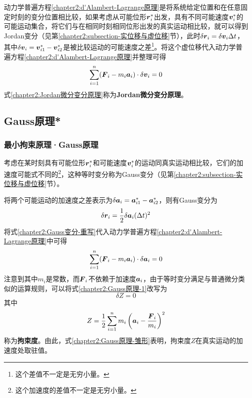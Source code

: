 动力学普遍方程\eqref{chapter2:d'Alambert-Lagrange原理}是将系统给定位置和在任意固定时刻的变分位置相比较，如果考虑从可能位形$\boldsymbol{r}_i^*$出发，具有不同可能速度$\boldsymbol{v}_i^*$的可能运动集合，将它们与在相同时刻相同位形出发的真实运动相比较，就可以得到Jordan变分（见第\ref{chapter2:subsection-实位移与虚位移}节），此时$\delta\boldsymbol{r}_i=\delta \boldsymbol{v}_i\Delta t$，其中$\delta\boldsymbol{v}_i=\boldsymbol{v}_{i1}^*-\boldsymbol{v}_{i2}^*$是被比较运动的可能速度之差\footnote{这个差值不一定是无穷小量。}。将这个虚位移代入动力学普遍方程\eqref{chapter2:d'Alambert-Lagrange原理}并整理可得
\begin{equation}
	\sum_{i=1}^n (\boldsymbol{F}_i-m_i\boldsymbol{a}_i)\cdot \delta \boldsymbol{v}_i = 0
	\label{chapter2:Jordan微分变分原理}
\end{equation}
式\eqref{chapter2:Jordan微分变分原理}称为{\bf Jordan微分变分原理}。

\subsection{Gauss原理*}

\subsubsection{最小拘束原理·Gauss原理}\label{chapter2:subsubsection-最小拘束原理·Gauss原理}

考虑在某时刻具有可能位形$\boldsymbol{r}_i^*$和可能速度$\boldsymbol{v}_i^*$的运动同真实运动相比较，它们的加速度可能式不同的\footnote{这个加速度的差值不一定是无穷小量。}，这种等时变分称为Gauss变分（见第\ref{chapter2:subsection-实位移与虚位移}节）。

将两个可能运动的加速度之差表示为$\delta\boldsymbol{a}_i=\boldsymbol{a}_{i1}^*-\boldsymbol{a}_{i2}^*$，则有Gauss变分为
\begin{equation}
	\delta\boldsymbol{r}_i = \frac12 \delta\boldsymbol{a}_i(\Delta t)^2
	\label{chapter2:Gauss变分-重写}
\end{equation}
将式\eqref{chapter2:Gauss变分-重写}代入动力学普遍方程\eqref{chapter2:d'Alambert-Lagrange原理}中可得
\begin{equation}
	\sum_{i=1}^n (\boldsymbol{F}_i-m_i\boldsymbol{a}_i)\cdot \delta\boldsymbol{a}_i=0
	\label{chapter2:Gauss原理-1}
\end{equation}
注意到其中$m_i$是常数，而$\boldsymbol{F}_i$不依赖于加速度$\boldsymbol{a}_i$，由于等时变分满足与普通微分类似的运算规则，可以将式\eqref{chapter2:Gauss原理-1}改写为
\begin{equation}
	\delta Z = 0
	\label{chapter2:Gauss原理-雏形}
\end{equation}
其中
\begin{equation}
	Z = \frac12 \sum_{i=1}^nm_i\left(\boldsymbol{a}_i-\frac{\boldsymbol{F}_i}{m_i}\right)^2
	\label{chapter2:拘束度定义}
\end{equation}
称为{\bf 拘束度}。由此，式\eqref{chapter2:Gauss原理-雏形}表明，拘束度$Z$在真实运动的加速度处取驻值。

